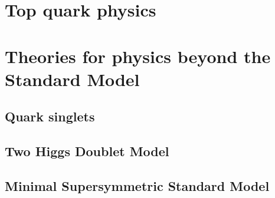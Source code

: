 \clearpage
\section{Top quark physics}

\clearpage
\section{Theories for physics beyond the Standard Model}
\label{sec:bsm}
\clearpage
\subsection{Quark singlets}

\clearpage
\subsection{Two Higgs Doublet Model}

\clearpage
\subsection{Minimal Supersymmetric Standard Model}

\clearpage

